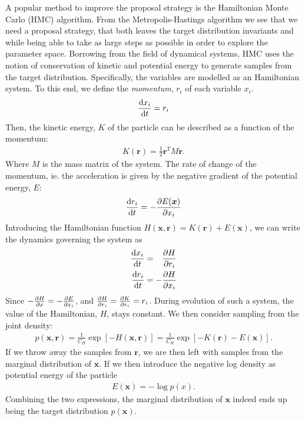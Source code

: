 A popular method to improve the proposal strategy is the Hamiltonian Monte Carlo (HMC) algorithm. 
From the Metropolis-Hastings algorithm we see that we need a proposal strategy, that both leaves the target distribution invariants and while being able to take as large steps as possible in order to explore the parameter space.
Borrowing from the field of dynamical systems, HMC uses the notion of conservation of kinetic and potential energy to generate samples from the target distribution. Specifically, the variables are modelled as an Hamiltonian system. To this end, we define the \emph{momentum}, $r_i$ of each variable $x_i$.
\begin{align*}
    \dv{x_i}{t} = r_i
\end{align*}
Then, the kinetic energy, $K$ of the particle can be described as a function of the momentum:
\begin{align*}
    K(\bm{r}) = \frac{1}{2}\bm{r}^T M \bm{r}.
\end{align*}
Where $M$ is the mass matrix of the system. The rate of change of the momentum, ie. the acceleration is given by the negative gradient of the potential energy, $E$:
\begin{align*}
    \dv{r_i}{t} = -\pdv{E(\bm{x})}{x_i}
\end{align*}
Introducing the Hamiltonian function $H(\bm{x}, \bm{r}) = K(\bm{r}) + E(\bm{x})$, we can write the dynamics governing the system as
\begin{align*}
    \dv{x_i}{t} &= \phantom{-}\pdv{H}{r_i}\\
    \dv{r_i}{t} &= -\pdv{H}{x_i}
\end{align*}
Since $-\pdv{H}{x} = -\pdv{E}{x_i}$, and $\pdv{H}{r_i} = \pdv{K}{r_i} = r_i$. During evolution of such a system, the value of the Hamiltonian, $H$, stays constant. We then consider sampling from the joint density:
\begin{align*}
    p(\bm{x}, \bm{r}) = \frac{1}{C_H} \exp\left[ -H(\bm{x}, \bm{r})\right] = \frac{1}{C_H} \exp\left[-K(\bm{r}) - E(\bm{x})  \right].
\end{align*}
If we throw away the samples from $\bm{r}$, we are then left with samples from the marginal distribution of $\bm{x}$. If we then introduce the negative log density as potential energy of the particle
\begin{align*}
    E(\bm{x}) = -\log{p(x)}.
\end{align*}
Combining the two expressions, the marginal distribution of $\bm{x}$ indeed ends up being the target distribution $p(\bm{x})$.

